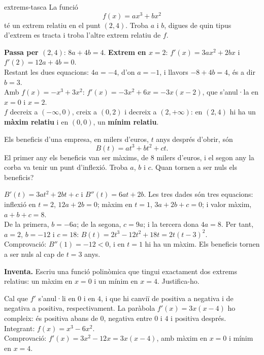 \begin{apartats}

\begin{tria}{extrems-tasca}
La funció
\[
f(x)=ax^3+bx^2
\]
té un extrem relatiu en el punt $(2,4)$. Troba $a$ i $b$, digues de quin tipus d'extrem es
tracta i troba l'altre extrem relatiu de $f$.

\begin{solucio}
\textbf{Passa per $(2,4)$}: $8a+4b=4$. \quad \textbf{Extrem en $x=2$}: $f'(x)=3ax^2+2bx$ i
$f'(2)=12a+4b=0$.\\
Restant les dues equacions: $4a=-4$, d'on $\boxed{a=-1}$, i llavors $-8+4b=4$, és a dir
$\boxed{b=3}$.\\
Amb $f(x)=-x^3+3x^2$: $f'(x)=-3x^2+6x=-3x(x-2)$, que s'anul·la en $x=0$ i $x=2$.\\
$f$ decreix a $(-\infty,0)$, creix a $(0,2)$ i decreix a $(2,+\infty)$: en $(2,4)$ hi ha un
\textbf{màxim relatiu} i en $(0,0)$, un \textbf{mínim relatiu}.
\end{solucio}

Els beneficis d'una empresa, en milers d'euros, $t$ anys després d'obrir, són
\[
B(t)=at^3+bt^2+ct .
\]
El primer any els beneficis van ser màxims, de $8$ milers d'euros, i el segon any la corba va
tenir un punt d'inflexió. Troba $a$, $b$ i $c$. Quan tornen a ser nuls els beneficis?

\begin{solucio}
$B'(t)=3at^2+2bt+c$ i $B''(t)=6at+2b$. Les tres dades són tres equacions: inflexió en $t=2$,
$12a+2b=0$; màxim en $t=1$, $3a+2b+c=0$; i valor màxim, $a+b+c=8$.\\
De la primera, $b=-6a$; de la segona, $c=9a$; i la tercera dona $4a=8$. Per tant,
$\boxed{a=2}$, $\boxed{b=-12}$ i $\boxed{c=18}$: $B(t)=2t^3-12t^2+18t=2t(t-3)^2$.\\
Comprovació: $B''(1)=-12<0$, i en $t=1$ hi ha un màxim. Els beneficis tornen a ser nuls al cap
de $\boxed{t=3}$ anys.
\end{solucio}
\end{tria}

\begin{nomesllarg}
\textbf{Inventa.} Escriu una funció polinòmica que tingui exactament dos extrems relatius: un
màxim en $x=0$ i un mínim en $x=4$. Justifica-ho.

\begin{solucio}
Cal que $f'$ s'anul·li en $0$ i en $4$, i que hi canviï de positiva a negativa i de negativa a
positiva, respectivament. La paràbola $f'(x)=3x(x-4)$ ho compleix: és positiva abans
de $0$, negativa entre $0$ i $4$ i positiva després.\\
Integrant: $f(x)=x^3-6x^2$.\\
Comprovació: $f'(x)=3x^2-12x=3x(x-4)$, amb màxim en $x=0$ i mínim en $x=4$.
\end{solucio}
\end{nomesllarg}


\end{apartats}
